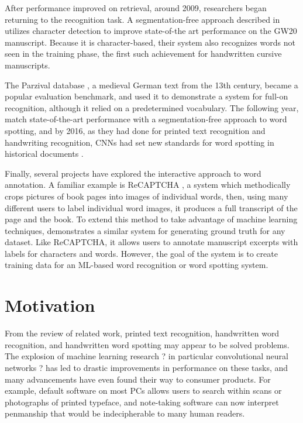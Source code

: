\documentclass[final]{ukthesis}
\begin{document}
After performance improved on retrieval, around 2009, researchers began returning to the recognition task. A segmentation-free approach described in \cite{howe2009finding} utilizes character detection to improve state-of-the art performance on the GW20 manuscript. Because it is character-based, their system also recognizes words not seen in the training phase, the first such achievement for handwritten cursive manuscripts.


The Parzival database \cite{fischer2010ground}, a medieval German text from the 13th century, became a popular evaluation benchmark, and \cite{fischer2014combined} used it to demonstrate a system for full-on recognition, although it relied on a predetermined vocabulary. The following year, \cite{rusinol2015efficient} match state-of-the-art performance with a segmentation-free approach to word spotting, and by 2016, as they had done for printed text recognition and handwriting recognition, CNNs had set new standards for word spotting in historical documents \cite{sudholt2016phocnet,zhong2016spottingnet,krishnan2016deep} .


Finally, several projects have explored the interactive approach to word annotation. A familiar example is ReCAPTCHA \cite{von2008recaptcha}, a system which methodically crops pictures of book pages into images of individual words, then, using many different users to label individual word images, it produces a full transcript of the page and the book. To extend this method to take advantage of machine learning techniques, \cite{biller2013webgt} demonstrates a similar system for generating ground truth for any dataset. Like ReCAPTCHA, it allows users to annotate manuscript excerpts with labels for characters and words. However, the goal of the system is to create training data for an ML-based word recognition or word spotting system.


%
%
\section{Motivation}
From the review of related work, printed text recognition, handwritten word recognition, and handwritten word spotting may appear to be solved problems. The explosion of machine learning research ? in particular convolutional neural networks ? has led to drastic improvements in performance on these tasks, and many advancements have even found their way to consumer products. For example, default software on most PCs allows users to search within scans or photographs of printed typeface, and note-taking software can now interpret penmanship that would be indecipherable to many human readers.
\end{document}
